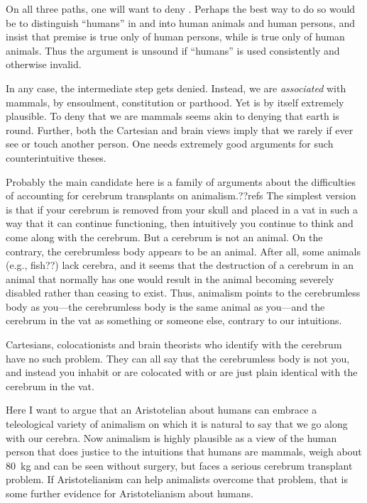 On all three paths, one will want to deny . Perhaps the best way to do so would be to distinguish ``humans'' 
in  and  into  human animals and human persons, and insist that premise  is true 
only of human persons, while  is true only of human animals. Thus the argument is unsound if ``humans'' is used 
consistently and otherwise invalid. 

In any case, the intermediate step  gets denied. Instead, we are 
\textit{associated} with mammals, by ensoulment, constitution or parthood.   Yet  is by itself extremely plausible. 
To deny that we are mammals seems akin to denying that earth
is round. Further, both the Cartesian and brain views imply that we
rarely if ever see or touch another person. One needs extremely good arguments for such counterintuitive theses. 

Probably the main candidate here is a family of arguments about the difficulties of accounting for cerebrum transplants
on animalism.??refs The simplest version is that if your cerebrum is removed from your skull and placed in a vat in such a way
that it can continue functioning, then intuitively you continue to think and come along with the cerebrum. But a cerebrum
is not an animal. On the contrary, the cerebrumless body appears to be an animal. After all, some animals (e.g., fish??) lack
cerebra, and it seems that the destruction of a cerebrum in an animal that normally has one would result in the animal 
becoming severely disabled rather than ceasing to exist. Thus, animalism points to the cerebrumless body as you---the cerebrumless
body is the same animal as you---and the cerebrum in the vat as something  or someone else, contrary to our intuitions.

Cartesians, colocationists and brain theorists who identify with the cerebrum have no such problem. They can all say that
the cerebrumless body is not you, and instead you inhabit or are colocated with or are just plain identical with the cerebrum
in the vat. 

Here I want to argue that an Aristotelian about humans can embrace a teleological variety of animalism on which it is natural to say that 
we go along with our cerebra. Now animalism is highly plausible as 
a view of the human person that does justice to the intuitions that humans are mammals, weigh about 80~kg and can be seen 
without surgery, but faces a serious cerebrum transplant problem. If Aristotelianism can help animalists overcome that problem,
that is some further evidence for Aristotelianism about humans.

